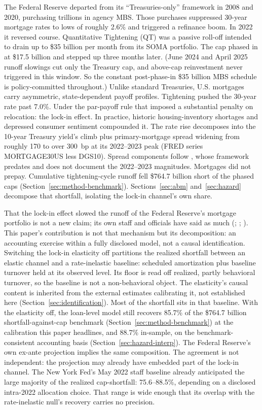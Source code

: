 \documentclass[12pt]{article}
\begin{document}
The Federal Reserve departed from its ``Treasuries-only'' framework in 2008 and 2020, purchasing trillions in agency MBS. Those purchases suppressed 30-year mortgage rates to lows of roughly 2.6\% \citep{hancock2011} and triggered a refinance boom. In 2022 it reversed course. Quantitative Tightening (QT) was a passive roll-off intended to drain up to \$35 billion per month from its SOMA portfolio. The cap phased in at \$17.5 billion and stepped up three months later. (June 2024 and April 2025 runoff slowings cut only the Treasury cap, and above-cap reinvestment never triggered in this window. So the constant post-phase-in \$35 billion MBS schedule is policy-committed throughout.) Unlike standard Treasuries, U.S. mortgages carry asymmetric, state-dependent payoff profiles. Tightening pushed the 30-year rate past 7.0\%. Under the par-payoff rule that imposed a substantial penalty on relocation: the lock-in effect. In practice, historic housing-inventory shortages and depressed consumer sentiment compounded it. The rate rise decomposes into the 10-year Treasury yield's climb plus primary-mortgage spread widening from roughly 170 to over 300~bp at its 2022--2023 peak (FRED series MORTGAGE30US less DGS10). Spread components follow \citet{boyarchenko2019}, whose framework predates and does not document the 2022--2023 magnitudes. Mortgages did not prepay. Cumulative tightening-cycle runoff fell \$764.7 billion short of the phased caps \citep[on the balance-sheet setting, see][]{lopezsalido2023,acharya2023} (Section~\ref{sec:method-benchmark}). Sections~\ref{sec:abm} and~\ref{sec:hazard} decompose that shortfall, isolating the lock-in channel's own share.

That the lock-in effect slowed the runoff of the Federal Reserve's mortgage portfolio is not a new claim; its own staff and officials have said as much (\citealp{na2024}; \citealp{perli2024}; \citealp{hammack2025}). This paper's contribution is not that mechanism but its decomposition: an accounting exercise within a fully disclosed model, not a causal identification. Switching the lock-in elasticity off partitions the realized shortfall between an elastic channel and a rate-inelastic baseline: scheduled amortization plus baseline turnover held at its observed level. Its floor is read off realized, partly behavioral turnover, so the baseline is not a non-behavioral object. The elasticity's causal content is inherited from the external estimates calibrating it, not established here (Section~\ref{sec:identification}). Most of the shortfall sits in that baseline. With the elasticity off, the loan-level model still recovers 85.7\% of the \$764.7 billion shortfall-against-cap benchmark (Section~\ref{sec:method-benchmark}) at the calibration this paper headlines, and 88.7\% in-sample, on the benchmark-consistent accounting basis (Section~\ref{sec:hazard-interp}). The Federal Reserve's own ex-ante projection implies the same composition. The agreement is not independent: the projection may already have embedded part of the lock-in channel. The New York Fed's May 2022 staff baseline already anticipated the large majority of the realized cap-shortfall: 75.6--88.5\%, depending on a disclosed intra-2022 allocation choice. That range is wide enough that its overlap with the rate-inelastic null's recovery carries no precision.
\end{document}
